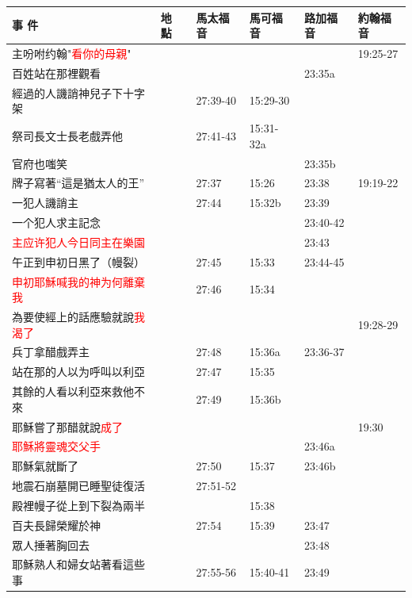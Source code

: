\begin{table}[H]
  \centering
    \begin{tabular}{p{14em}|p{7.93em}|l|l|l|p{4.855em}}
    \toprule
    \textbf{事 件} & \textbf{地 點} & \multicolumn{1}{p{5.285em}|}{\textbf{馬太福音}} & \multicolumn{1}{p{5.57em}|}{\textbf{馬可福音}} & \multicolumn{1}{p{5.285em}|}{\textbf{路加福音}} & \textbf{約翰福音} \\  \midrule

主吩咐约翰"\textcolor{red}{看你的母親}"&       & &        &&19:25-27\\\midrule

百姓站在那裡觀看&       & &        &23:35a&  \\\midrule
經過的人譏誚神兒子下十字架&       &27:39-40&15:29-30&&  \\\midrule
祭司長文士長老戲弄他&       &27:41-43&15:31-32a&&  \\\midrule


官府也嗤笑&       & &        &23:35b&  \\\midrule

牌子寫著“這是猶太人的王”& &27:37&15:26&23:38&19:19-22\\\midrule
一犯人譏誚主& &27:44&15:32b &23:39&  \\\midrule
一个犯人求主記念& &&       &23:40-42&  \\\midrule
\textcolor{red}{主应许犯人今日同主在樂園}& &&       &23:43&  \\\midrule

午正到申初日黑了（幔裂）&       &27:45& 15:33 &23:44-45&  \\\midrule
\textcolor{red}{申初耶穌喊我的神为何離棄我}&       &27:46&15:34&&  \\\midrule

為要使經上的話應驗就說\textcolor{red}{我渴了}&       & &        &&19:28-29\\\midrule
兵丁拿醋戲弄主&  &27:48&15:36a  &23:36-37&  \\\midrule

站在那的人以为呼叫以利亞&       &27:47& 15:35  &&  \\\midrule
其餘的人看以利亞來救他不來&       &27:49&15:36b  &&  \\\midrule
耶穌嘗了那醋就說\textcolor{red}{成了}&       &&       &&19:30\\\midrule
\textcolor{red}{耶穌將靈魂交父手}&       &&       &23:46a&  \\\midrule
耶穌氣就斷了&       &27:50&15:37 &23:46b&  \\\midrule
地震石崩墓開已睡聖徒復活&       &27:51-52&       &&  \\\midrule
殿裡幔子從上到下裂為兩半&       && 15:38      &&  \\\midrule
百夫長歸榮耀於神&       &27:54 &15:39 &23:47&  \\\midrule
眾人捶著胸回去&       &       &       &23:48&  \\\midrule
耶穌熟人和婦女站著看這些事&       &27:55-56&15:40-41 &23:49&  \\\midrule


\end{tabular}
\end{table}
